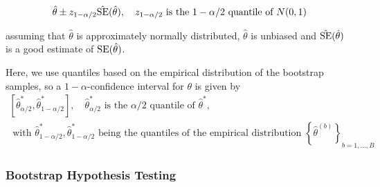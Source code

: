 \begin{equation}
    \hat{\theta} \pm z_{1 - \alpha/2} \hat{\operatorname{SE}}(\hat{\theta}), \quad z_{1 - \alpha/2} \text{ is the } 1 - \alpha/2 \text{ quantile of } N(0,1)
\end{equation}

assuming that $\hat{\theta}$ is approximately normally distributed, $\hat{\theta}$ is unbiased and $\hat{\operatorname{SE}}(\hat{\theta})$ is a good estimate of $\operatorname{SE}(\hat{\theta})$.

Here, we use quantiles based on the empirical distribution of the bootstrap samples, so a $1-\alpha$-confidence interval for $\theta$ is given by
\begin{equation}
    \begin{multlined}
        \left[ \hat{\theta}^*_{\alpha/2}, \hat{\theta}^*_{1 - \alpha/2} \right], \quad \hat{\theta}^*_{\alpha/2} \text{ is the } \alpha/2 \text{ quantile of } \hat{\theta}^*, \\
        \text{ with } \hat{\theta}^*_{1 - \alpha/2}, \hat{\theta}^*_{1 - \alpha/2} \text{ being the quantiles of the empirical distribution } \left\{ \hat{\theta}^{(b)} \right\}_{b=1,\dots,B}
    \end{multlined}
\end{equation}


\subsubsection{Bootstrap Hypothesis Testing}
\label{subsec:bootstrap_hypothesis_testing}

